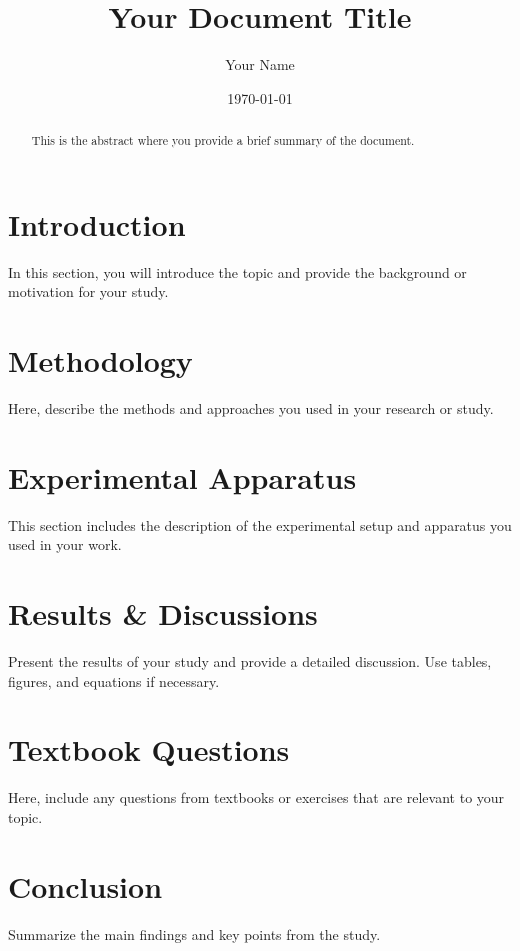 \documentclass{article}
\title{Your Document Title}
\author{Your Name}
\date{\today}
\begin{document}
\maketitle

\begin{abstract}
This is the abstract where you provide a brief summary of the document.
\end{abstract}

\section{Introduction}
In this section, you will introduce the topic and provide the background or motivation for your study.

\section{Methodology}
Here, describe the methods and approaches you used in your research or study.

\section{Experimental Apparatus}
This section includes the description of the experimental setup and apparatus you used in your work.

\section{Results \& Discussions}
Present the results of your study and provide a detailed discussion. Use tables, figures, and equations if necessary.

\section{Textbook Questions}
Here, include any questions from textbooks or exercises that are relevant to your topic.

\section{Conclusion}
Summarize the main findings and key points from the study.

\printbibliography
\end{document}
